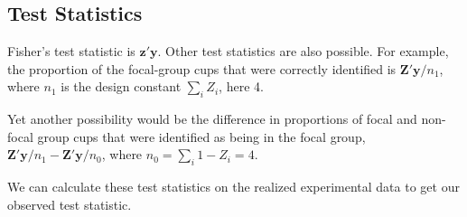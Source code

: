 \documentclass[12pt,leqno]{article}
\newenvironment{Shaded}{\begin{snugshade}}{\end{snugshade}}
\newcommand{\DataTypeTok}[1]{\textcolor[rgb]{0.13,0.29,0.53}{#1}}
\newcommand{\DecValTok}[1]{\textcolor[rgb]{0.00,0.00,0.81}{#1}}
\newcommand{\KeywordTok}[1]{\textcolor[rgb]{0.13,0.29,0.53}{\textbf{#1}}}
\newcommand{\NormalTok}[1]{#1}
\newcommand{\OperatorTok}[1]{\textcolor[rgb]{0.81,0.36,0.00}{\textbf{#1}}}
\newcommand{\StringTok}[1]{\textcolor[rgb]{0.31,0.60,0.02}{#1}}
\theoremstyle{newstyle}
\begin{document}
\hypertarget{test-statistics}{%
\subsection{Test Statistics}\label{test-statistics}}

Fisher's test statistic is \(\mathbf{z}'\mathbf{y}\). Other test
statistics are also possible. For example, the proportion of the
focal-group cups that were correctly identified is
\(\mathbf{Z}'\mathbf{y}/n_1\), where \(n_{1}\) is the design constant
\(\sum_{i} Z_{i}\), here 4.

Yet another possibility would be the difference in proportions of focal
and non-focal group cups that were identified as being in the focal
group, \(\mathbf{Z}'\mathbf{y}/n_{1} - \mathbf{Z}'\mathbf{y}/n_{0}\),
where \(n_{0}= \sum_{i} 1- Z_{i} = 4\).

We can calculate these test statistics on the realized experimental data
to get our observed test statistic.

\begin{Shaded}
\end{Shaded}
\end{document}
